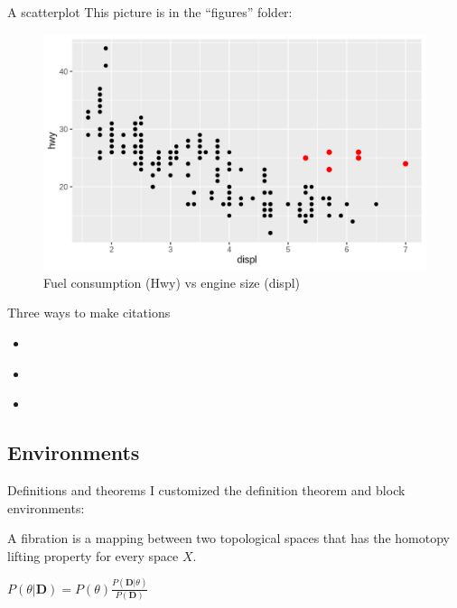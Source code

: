 \begin{frame}{A scatterplot}
	This picture is in the ``figures'' folder:
	\begin{figure}
	\includegraphics[scale=.5]{figures/graph.png}
	\caption{Fuel consumption (Hwy) vs engine size (displ)}
	\end{figure}
\end{frame}

\begin{frame}{Three ways to make citations}
	\begin{itemize}
	\item \cite{kass1995}
	\item \citep{kass1995}
	\item \citet{kass1995}
	\end{itemize}
\end{frame}

\subsection{Environments}

\begin{frame}{Definitions and theorems}
	I customized the definition theorem and block environments:
	\begin{definition}[Fibration]
	A fibration is a mapping between two topological spaces that has the homotopy lifting property for every space $X$.
	\end{definition}
	\begin{theorem}[Bayes]
	$P(\theta|\textbf{D}) = P(\theta ) \frac{P(\textbf{D} |\theta)}{P(\textbf{D})}$
	\end{theorem}
\end{frame}

